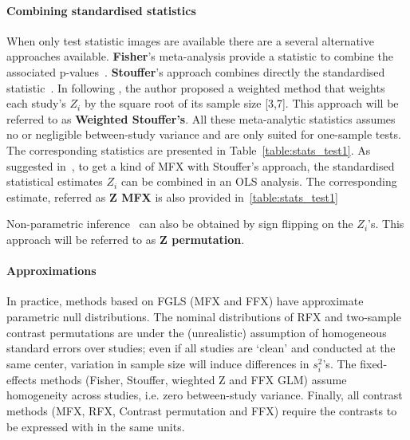 \documentclass[preprint]{elsarticle}
\newcommand{\vareffect}[1][i]{s^2_{#1}}
\newcommand{\zeffect}[1][\studyidx]{Z_{#1}}
\newcommand{\studyidx}{i}
\begin{document}
\paragraph{Combining standardised statistics} 
When only test statistic images are available there are a several alternative approaches available. \textbf{Fisher}'s meta-analysis provide a statistic to combine the associated p-values~\cite{Fisher1932}. \textbf{Stouffer}'s approach combines directly the standardised statistic~\cite{Stouffer1949}. In \cite{Zaykin2011} following \cite{Liptak1958}, the author proposed a weighted method that weights each study's $\zeffect$ by the square root of its sample size [3,7]. This approach will be referred to as \textbf{Weighted Stouffer's}. All these meta-analytic statistics assumes no or negligible between-study variance and are only suited for one-sample tests. The corresponding statistics are presented in Table~\ref{table:stats_test1}.
As suggested in~\cite{Salimi-khorshidi2009}, to get a kind of MFX with Stouffer's approach, the standardised statistical estimates $\zeffect$ can be combined in an OLS analysis. The corresponding estimate, referred as \textbf{Z MFX} is also provided in~\ref{table:stats_test1}

Non-parametric inference~\cite{Holmes1996,Nichols2002} can also be obtained by sign flipping on the $\zeffect$'s. This approach will be referred to as \textbf{Z permutation}.

\paragraph{Approximations}  In practice, methods based on FGLS (MFX and FFX) have approximate parametric null distributions.  The nominal distributions of RFX and two-sample contrast permutations are under the (unrealistic) assumption of homogeneous standard errors over studies; even if all studies are `clean' and conducted at the same center, variation in sample size will induce differences in $\vareffect$'s. The fixed-effects methods (Fisher, Stouffer, wieghted Z and FFX GLM) assume homogeneity across studies, i.e. zero between-study variance. Finally, all contrast methods (MFX, RFX, Contrast permutation and FFX) require the contrasts to be expressed with in the same units.


\end{document}
